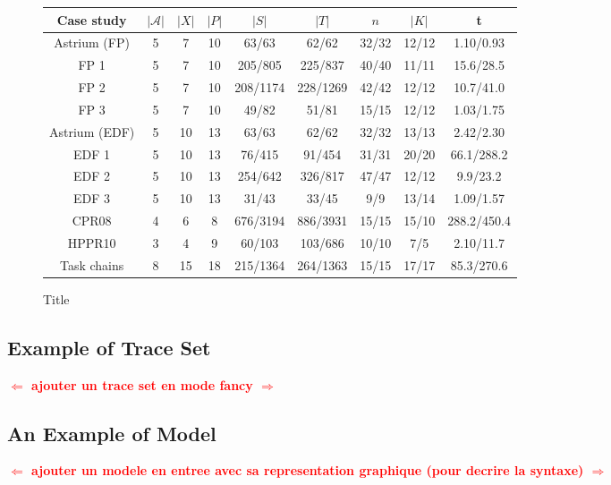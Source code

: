 \documentclass{llncs}
\newcommand{\commentaire}[1]{\textcolor{red}{\textbf{$\Leftarrow$  #1 $\Rightarrow$}}}
\begin{document}
\begin{figure}[!ht]
 \centering
 \label{table:results}
\begin{tabular}{|c|c|c|c|c|c|c|c|c|}
\hline
 Case study             & $|\mathcal{A}|$& $|X|$ & $|P|$ & $|S|$        & $|T|$         & $n$   &
$|K|$ & t               \\
\hline
Astrium (FP)\cite{Soulat12}       & 5 & 7         & 10    & 63/63         & 62/62         & 32/32 &
12/12 & 1.10/0.93       \\
\hline
FP 1            & 5 & 7         & 10    & 205/805       & 225/837       & 40/40 & 11/11 & 15.6/28.5  \\
\hline
FP 2            & 5 & 7         & 10    & 208/1174      & 228/1269      & 42/42 & 12/12 & 10.7/41.0  \\
\hline
FP 3            & 5 & 7         & 10    & 49/82         & 51/81         & 15/15 & 12/12 & 1.03/1.75  \\
\hline
Astrium (EDF)   & 5 & 10        & 13    & 63/63         & 62/62         & 32/32 & 13/13 &
2.42/2.30       \\
\hline
EDF 1           & 5 & 10        & 13    & 76/415        & 91/454 & 31/31        & 20/20 & 66.1/288.2  \\
\hline
EDF 2           & 5 & 10        & 13    & 254/642       & 326/817       & 47/47 & 12/12 & 9.9/23.2  \\
\hline
EDF 3           & 5 & 10&  13   & 31/43         & 33/45         & 9/9   & 13/14 & 1.09/1.57  \\
\hline
CPR08\cite{CPR08}               & 4 & 6         & 8     & 676/3194      & 886/3931      & 15/15 & 15/10
& 288.2/450.4   \\
\hline
HPPR10\cite{LPPRC10}             & 3 & 4 &  9& 60/103    & 103/686               & 10/10 & 7/5 &
2.10/11.7\\
\hline
Task chains\cite{SGL97} & 8 & 15 & 18 & 215/1364 & 264/1363 & 15/15 &
17/17 & 85.3/270.6\\
\hline
\end{tabular}
\caption{Title}
\end{figure}


\subsection*{Example of Trace Set}

\commentaire{ajouter un trace set en mode fancy}

\subsection*{An Example of Model}

\commentaire{ajouter un modele en entree avec sa representation graphique (pour decrire la syntaxe)}
\end{document}
